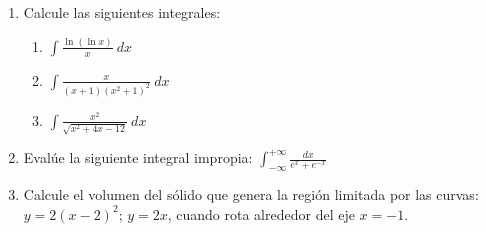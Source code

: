 \documentclass[11pt,a4paper,oneside]{article}\usepackage[]{graphicx}\usepackage[]{color}
\begin{document}
\begin{enumerate}
      \item Calcule las siguientes integrales: 
      \begin{enumerate}
            \item $\displaystyle \int \frac{\ln \left(\ln x\right)}{x}\ dx$
            \item $\displaystyle \int \frac{x}{(x+1)(x^2+1)^2}\ dx$
            \item $\displaystyle \int \frac{x^2}{\sqrt{x^2+4x-12}}\ dx$
      \end{enumerate}
      
      \item Evalúe la siguiente integral impropia: $\displaystyle \int_{-\infty}^{+\infty} \frac{dx}{e^x+e^{-x}}$
      
      \item Calcule el volumen del sólido que genera la región limitada por las curvas: $y=2(x-2)^2$; $y=2x$, cuando rota alrededor del eje $x=-1$.

\end{enumerate}
\end{document}

